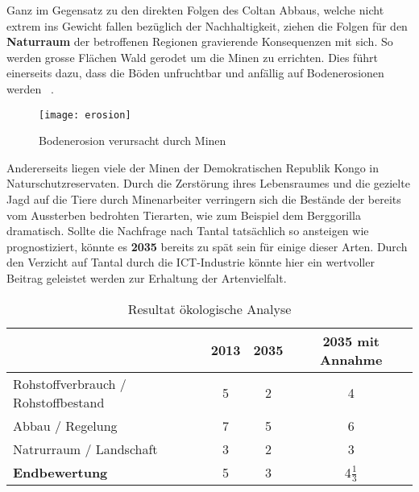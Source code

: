 Ganz im Gegensatz zu den direkten Folgen des Coltan Abbaus, welche nicht extrem
ins Gewicht fallen bezüglich der Nachhaltigkeit, ziehen die Folgen für den
\textbf{Naturraum} der betroffenen Regionen gravierende Konsequenzen mit sich.
So werden grosse Flächen Wald gerodet um die Minen zu errichten. Dies führt
einerseits dazu, dass die Böden unfruchtbar und anfällig auf Bodenerosionen
werden ~\cite{environmental_management}.

\begin{figure}[h]
\centering
\texttt{[image: erosion]}
\caption{Bodenerosion verursacht durch Minen ~\cite{Coltanmi34:online}}
\label{}
\end{figure}
\pagebreak

Andererseits liegen viele der Minen der Demokratischen Republik Kongo in
Naturschutzreservaten. Durch die Zerstörung ihres Lebensraumes und die gezielte
Jagd auf die Tiere durch Minenarbeiter verringern sich die Bestände der bereits
vom Aussterben bedrohten Tierarten, wie zum Beispiel dem Berggorilla dramatisch.
Sollte die Nachfrage nach Tantal tatsächlich so ansteigen wie prognostiziert,
könnte es \textbf{2035} bereits zu spät sein für einige dieser Arten.
Durch den Verzicht auf Tantal durch die ICT-Industrie könnte hier ein wertvoller
Beitrag geleistet werden zur Erhaltung der Artenvielfalt.

\begin{table}[h]
  \centering
  \begin{tabular}{l|ccc}                                    & \textbf{2013} & \textbf{2035} & \textbf{2035 mit Annahme}
    \\ \hline Rohstoffverbrauch / Rohstoffbestand                 & 5             & 2             & 4 
    \\ Abbau / Regelung                                           & 7             & 5             & 6
    \\ Natrurraum / Landschaft                                    & 3             & 2             & 3
    \\ \hline \textbf{Endbewertung}                               & 5             & 3             & 4\(\frac{1}{3}\)
  \end{tabular}
  \caption{Resultat ökologische Analyse}
\end{table}
